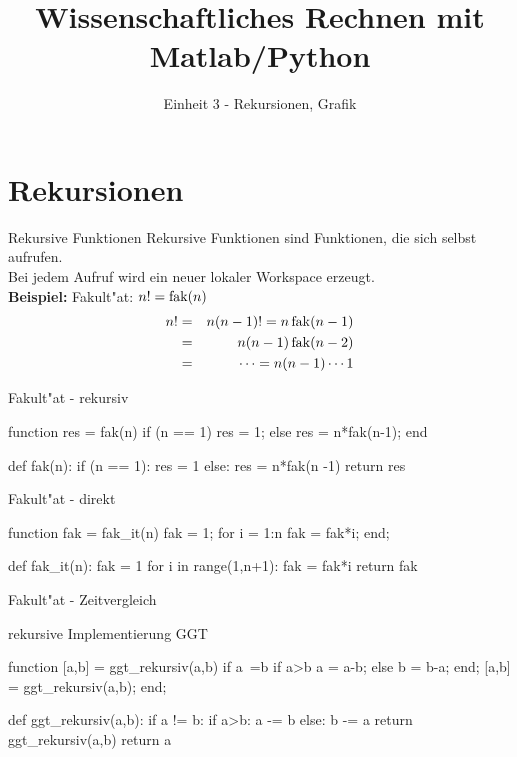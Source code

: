 \documentclass[hyperref={xetex}]{beamer}
\title{Wissenschaftliches Rechnen mit Matlab/Python}
\subtitle{Einheit 3 - Rekursionen, Grafik}
\begin{document}
\titlepage


\section{Rekursionen}
%
%
\begin{frame}[fragile]{Rekursive Funktionen}
Rekursive Funktionen sind Funktionen, die sich selbst aufrufen.\\
Bei jedem Aufruf wird ein neuer lokaler Workspace erzeugt.\\[1cm]

\textbf{Beispiel:} Fakult"at: $n!=\operatorname{fak}(n)$\\
\begin{eqnarray*}
 n!& = & n(n-1)!=n \operatorname{fak}(n-1)\\
& = & n(n-1)\operatorname{fak}(n-2)\\
& = & \cdots= n(n-1)\cdots 1 
\end{eqnarray*}
\end{frame}
%
%
\begin{frame}[fragile]{Fakult"at - rekursiv}
\begin{matlabin}
function res = fak(n)
if (n == 1)
    res = 1;
else
    res = n*fak(n-1);
end
\end{matlabin}
\begin{pyin}
def fak(n):
  if (n == 1):
    res = 1
  else:
   res = n*fak(n -1)
  return res
\end{pyin}
\end{frame}
%
%
\begin{frame}[fragile]{Fakult"at - direkt}
\begin{matlabin}
function fak = fak_it(n)
fak = 1;
for i = 1:n
  fak = fak*i;
end;
\end{matlabin}
\begin{pyin}
def fak_it(n):
    fak = 1
    for i in range(1,n+1):
        fak = fak*i
    return fak
\end{pyin}
\end{frame}
%
%
\begin{frame}[fragile]{Fakult"at - Zeitvergleich}
\begin{pyin}
\end{pyin}
\end{frame}
%
%
\begin{frame}[fragile]{rekursive Implementierung GGT}
\begin{matlabin}
function [a,b] = ggt_rekursiv(a,b)
if a~=b
  if a>b
    a = a-b;
  else
    b = b-a;
  end;
  [a,b] = ggt_rekursiv(a,b);
end;  
\end{matlabin}
\begin{pyin}
def ggt_rekursiv(a,b):
  if a != b:
    if a>b:
      a -= b
    else:
      b -= a
    return ggt_rekursiv(a,b)
  return a
\end{pyin}
\end{frame}
\end{document}

